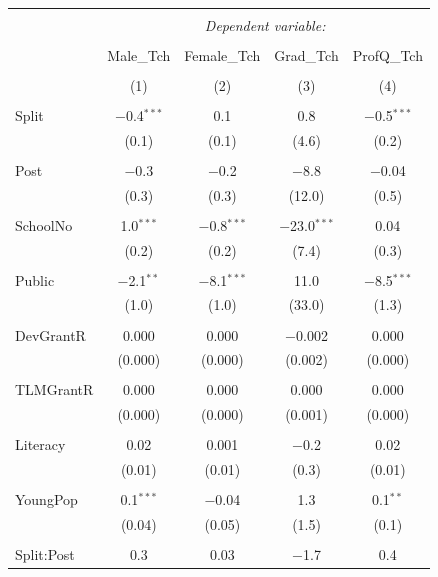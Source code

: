 \documentclass[12pt, a4paper]{article}
\begin{document}
\begin{table}[!htbp] \centering 
  \caption{} 
  \label{} 
\begin{tabular}{@{\extracolsep{5pt}}lcccc} 
\\[-1.8ex]\hline 
\hline \\[-1.8ex] 
 & \multicolumn{4}{c}{\textit{Dependent variable:}} \\ 
\cline{2-5} 
\\[-1.8ex] & Male\_Tch & Female\_Tch & Grad\_Tch & ProfQ\_Tch \\ 
\\[-1.8ex] & (1) & (2) & (3) & (4)\\ 
\hline \\[-1.8ex] 
 Split & $-$0.4$^{***}$ & 0.1 & 0.8 & $-$0.5$^{***}$ \\ 
  & (0.1) & (0.1) & (4.6) & (0.2) \\ 
  & & & & \\ 
 Post & $-$0.3 & $-$0.2 & $-$8.8 & $-$0.04 \\ 
  & (0.3) & (0.3) & (12.0) & (0.5) \\ 
  & & & & \\ 
 SchoolNo & 1.0$^{***}$ & $-$0.8$^{***}$ & $-$23.0$^{***}$ & 0.04 \\ 
  & (0.2) & (0.2) & (7.4) & (0.3) \\ 
  & & & & \\ 
 Public & $-$2.1$^{**}$ & $-$8.1$^{***}$ & 11.0 & $-$8.5$^{***}$ \\ 
  & (1.0) & (1.0) & (33.0) & (1.3) \\ 
  & & & & \\ 
 DevGrantR & 0.000 & 0.000 & $-$0.002 & 0.000 \\ 
  & (0.000) & (0.000) & (0.002) & (0.000) \\ 
  & & & & \\ 
 TLMGrantR & 0.000 & 0.000 & 0.000 & 0.000 \\ 
  & (0.000) & (0.000) & (0.001) & (0.000) \\ 
  & & & & \\ 
 Literacy & 0.02 & 0.001 & $-$0.2 & 0.02 \\ 
  & (0.01) & (0.01) & (0.3) & (0.01) \\ 
  & & & & \\ 
 YoungPop & 0.1$^{***}$ & $-$0.04 & 1.3 & 0.1$^{**}$ \\ 
  & (0.04) & (0.05) & (1.5) & (0.1) \\ 
  & & & & \\ 
 Split:Post & 0.3 & 0.03 & $-$1.7 & 0.4 \\ 

\end{tabular}
\end{table}
\end{document}
